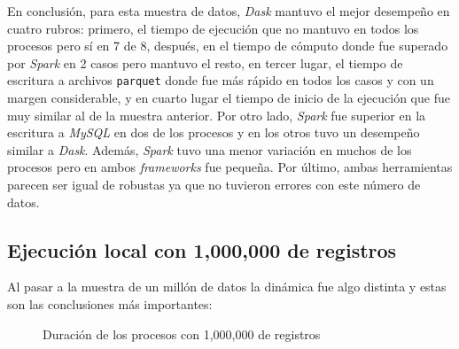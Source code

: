 En conclusión, para esta muestra de datos, \textit{Dask} mantuvo el mejor desempeño en cuatro rubros: primero, el tiempo de ejecución que no mantuvo en todos los procesos pero sí en 7 de 8, después, en el tiempo de cómputo donde fue superado por \textit{Spark} en 2 casos pero mantuvo el resto, en tercer lugar, el tiempo de escritura a archivos \texttt{parquet} donde fue más rápido en todos los casos y con un margen considerable, y en cuarto lugar el tiempo de inicio de la ejecución que fue muy similar al de la muestra anterior. Por otro lado, \textit{Spark} fue superior en la escritura a \textit{MySQL} en dos de los procesos y en los otros tuvo un desempeño similar a \textit{Dask}. Además, \textit{Spark} tuvo una menor variación en muchos de los procesos pero en ambos \textit{frameworks} fue pequeña. Por último, ambas herramientas parecen ser igual de robustas ya que no tuvieron errores con este número de datos. 


\subsection{Ejecución local con 1,000,000 de registros}

Al pasar a la muestra de un millón de datos la dinámica fue algo distinta y estas son las conclusiones más importantes:

\begin{center}
\begin{figure}
\caption{Duración de los procesos con 1,000,000 de registros}
\label{barras:duracion1M}
\end{figure}
\end{center}

